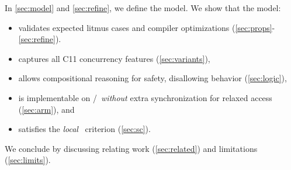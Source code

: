 In \textsection\ref{sec:model} and \textsection\ref{sec:refine}, we define the model.  We show that the model:
\begin{itemize}
\item validates expected litmus cases and compiler optimizations
  (\textsection\ref{sec:props}-\ref{sec:refine}).

\item captures all C11 concurrency features  %
  (\textsection\ref{sec:variants}),

\item allows compositional reasoning for safety, disallowing \oota{} behavior %
  (\textsection\ref{sec:logic}),

\item is implementable on \armeight/\tso\ {\em without} extra synchronization for
  relaxed access (\textsection\ref{sec:arm}), and

\item  satisfies the \emph{local} \drfsc\ criterion \cite{Dolan:2018:BDR:3192366.3192421} (\textsection\ref{sec:sc}).

\end{itemize}
We conclude by discussing relating work (\textsection\ref{sec:related}) and limitations (\textsection\ref{sec:limits}).







